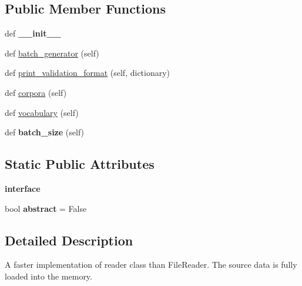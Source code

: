 \subsection*{Public Member Functions}
\begin{DoxyCompactItemize}
\item 
def {\bfseries \+\_\+\+\_\+init\+\_\+\+\_\+}\hypertarget{classreader_1_1MemoryInput_a5e90c1e76caf2286e50fb47cfbdb47d9}{}\label{classreader_1_1MemoryInput_a5e90c1e76caf2286e50fb47cfbdb47d9}

\item 
def \hyperlink{classreader_1_1MemoryInput_ae081cdff2fd546cae6cc05f52eb1c7a7}{batch\+\_\+generator} (self)
\item 
def \hyperlink{classreader_1_1MemoryInput_a56635971dedfb9830885abc7e8158feb}{print\+\_\+validation\+\_\+format} (self, dictionary)
\item 
def \hyperlink{classreader_1_1MemoryInput_a57b5d5e3039725ca9a84cecdd0b66051}{corpora} (self)
\item 
def \hyperlink{classreader_1_1MemoryInput_a4fec72e8b1f438ed2f2c733fa65c5577}{vocabulary} (self)
\item 
def {\bfseries batch\+\_\+size} (self)\hypertarget{classreader_1_1MemoryInput_a4a37a8c307159adc280eabbf78521978}{}\label{classreader_1_1MemoryInput_a4a37a8c307159adc280eabbf78521978}

\end{DoxyCompactItemize}
\subsection*{Static Public Attributes}
\begin{DoxyCompactItemize}
\item 
{\bfseries interface}
\item 
bool {\bfseries abstract} = False\hypertarget{classreader_1_1MemoryInput_a71d03d985f949d8878ae0ec734d1a2b8}{}\label{classreader_1_1MemoryInput_a71d03d985f949d8878ae0ec734d1a2b8}

\end{DoxyCompactItemize}


\subsection{Detailed Description}
\begin{DoxyVerb}A faster implementation of reader class than FileReader. The source data is fully loaded into
the memory.
\end{DoxyVerb}
 

